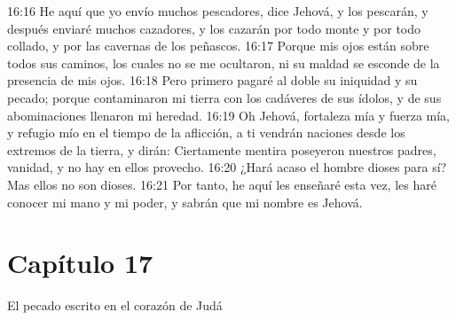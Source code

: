 16:16 He aquí que yo envío muchos pescadores, dice Jehová, y los pescarán, y después enviaré muchos cazadores, y los cazarán por todo monte y por todo collado, y por las cavernas de los peñascos. 
16:17 Porque mis ojos están sobre todos sus caminos, los cuales no se me ocultaron, ni su maldad se esconde de la presencia de mis ojos. 
16:18 Pero primero pagaré al doble su iniquidad y su pecado; porque contaminaron mi tierra con los cadáveres de sus ídolos, y de sus abominaciones llenaron mi heredad. 
16:19 Oh Jehová, fortaleza mía y fuerza mía, y refugio mío en el tiempo de la aflicción, a ti vendrán naciones desde los extremos de la tierra, y dirán: Ciertamente mentira poseyeron nuestros padres, vanidad, y no hay en ellos provecho. 
16:20 ¿Hará acaso el hombre dioses para sí? Mas ellos no son dioses. 
16:21 Por tanto, he aquí les enseñaré esta vez, les haré conocer mi mano y mi poder, y sabrán que mi nombre es Jehová. 
\section*{Capítulo 17 }
El pecado escrito en el corazón de Judá 
 

